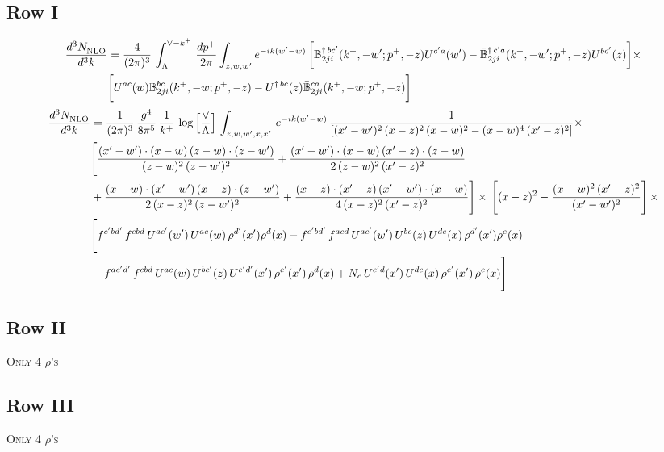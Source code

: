 \documentclass[9pt]{article}
\def\mf#1{\mathbb{#1}}
\numberwithin{equation}{section}
\begin{document}
\subsection{Row I}
\begin{align}
    \frac{d^{3}N_{\rm NLO}^{\rm}}{d^{3}k}  & = \frac{4}{(2\pi)^{3}}\,\int_{\Lambda}^{\vee-k^{+}}\, \frac{dp^{+}}{2\pi}\int_{z,w,w^{\prime}} e^{-ik(w^{\prime}-w)}\, \bigg[\mf{B}^{\dagger\, bc^{\prime}}_{2ji}(k^{+},-w^{\prime};p^{+},-z)U^{ c^{\prime}a}(w^{\prime}) -\Bar{\mf{B}}^{\dagger\, c^{\prime}a}_{2ji}(k^{+},-w^{\prime}; p^{+},-z)U^{bc^{\prime}}(z)\bigg]\times\notag \\ & \bigg[U^{ac}(w) \mf{B}^{bc}_{2ji}(k^{+},-w;p^{+},-z) -U^{\dagger\, bc}(z)\Bar{\mf{B}}^{ca}_{2ji}(k^{+},-w; p^{+},-z)\bigg]\nonumber
\end{align}
\begin{align}
 \frac{d^{3}N_{\rm NLO}^{\rm}}{d^{3}k}  & =     \frac{1}{(2\pi)^{3}}\, \frac{g^{4}}{8\pi^{5}}\,\frac{1}{k^{+}}\,\log{\left[\frac{\vee}{\Lambda}\right]}\,\int_{z,w,w^{\prime},x,x'}\, e^{-ik(w^{\prime}-w)}\, \frac{1}{\left[(x'-w')^{2}\,(x-z)^{2}\,(x-w)^{2} - (x-w)^{4}\, (x'-z)^{2}\right]} \times\notag \\ & \Bigg[\frac{(x'-w')\cdot (x-w)\, (z-w)\cdot (z-w')}{(z-w)^{2}\, (z-w')^{2}}+\frac{(x'-w')\cdot (x-w)\, (x'-z)\cdot (z-w)}{2\, (z-w)^{2}\, (x'-z)^{2}}\notag \\ & +\frac{(x-w)\cdot (x'-w')\, (x-z)\cdot (z-w')}{2\, (x-z)^{2}\, (z-w')^{2}}+\frac{(x-z)\cdot (x'-z)\, (x'-w')\cdot (x-w)}{4\, (x-z)^{2}\, (x'-z)^{2}}\Bigg] \times\,\Bigg[(x-z)^{2} - \frac{(x-w)^{2}\, (x'-z)^{2}}{(x'-w')^{2}}\Bigg]\,\times \notag \\ & \Bigg[f^{c'bd'}\,f^{cbd}\, U^{ac'}(w')\,U^{ac}(w)\,\rho^{d'}(x')\rho^{d}(x)- f^{c'bd'}\,f^{acd}\,U^{ac'}(w')\,U^{bc}(z)\,U^{de}(x)\,\rho^{d'}(x')\rho^{e}(x) \notag \\ & -f^{ac'd'}\,f^{cbd}\,U^{ac}(w)\,U^{bc'}(z)\,U^{e'd'}(x')\,\rho^{e'}(x')\,\rho^{d}(x) +N_{c}\,U^{e'd}(x')\,U^{de}(x)\,\rho^{e'}(x')\,\rho^{e}(x)\Bigg]
\end{align}
\subsection{Row II}
\textsc{Only 4 $\rho$'s}
\subsection{Row III}
\textsc{Only 4 $\rho$'s}
\end{document}
